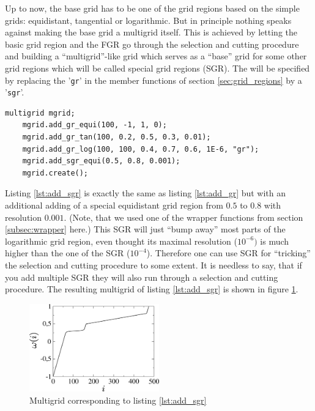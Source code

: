 Up to now, the base grid has to be one of the grid regions based on the simple grids: equidistant, tangential or logarithmic. But in principle nothing speaks against making the base grid a multigrid itself. This is achieved by letting the basic grid region and the FGR go through the selection and cutting procedure and building a ``multigrid''-like grid which serves as a ``base'' grid for some other grid regions which will be called special grid regions (SGR). The will be specified by replacing the '\texttt{gr}' in the member functions of section \ref{sec:grid_regions} by a '\texttt{sgr}'.
\begin{lstlisting}[caption={Example for adding special grid regions},label={lst:add_sgr}]
	multigrid mgrid;
	mgrid.add_gr_equi(100, -1, 1, 0);
	mgrid.add_gr_tan(100, 0.2, 0.5, 0.3, 0.01);
	mgrid.add_gr_log(100, 100, 0.4, 0.7, 0.6, 1E-6, "gr");
	mgrid.add_sgr_equi(0.5, 0.8, 0.001);
	mgrid.create();
\end{lstlisting}
Listing \ref{lst:add_sgr} is exactly the same as listing \ref{lst:add_gr} but with an additional adding of a special equidistant grid region from $0.5$ to $0.8$ with resolution $0.001$. (Note, that we used one of the wrapper functions from section \ref{subsec:wrapper} here.) This SGR will just ``bump away'' most parts of the logarithmic grid region, even thought its maximal resolution ($10^{-6})$ is much higher than the one of the SGR ($10^{-4}$). Therefore one can use SGR for ``tricking'' the selection and cutting procedure to some extent. It is needless to say, that if you add multiple SGR they will also run through a selection and cutting procedure. The resulting multigrid of listing \ref{lst:add_sgr} is shown in figure \ref{fig:example_add_sgr}.
\begin{figure}[h]
	\centering
	\includegraphics[width=0.5\textwidth]{pics/example_add_sgr.eps}
	\caption{Multigrid corresponding to listing \ref{lst:add_sgr}}
	\label{fig:example_add_sgr}
\end{figure}

